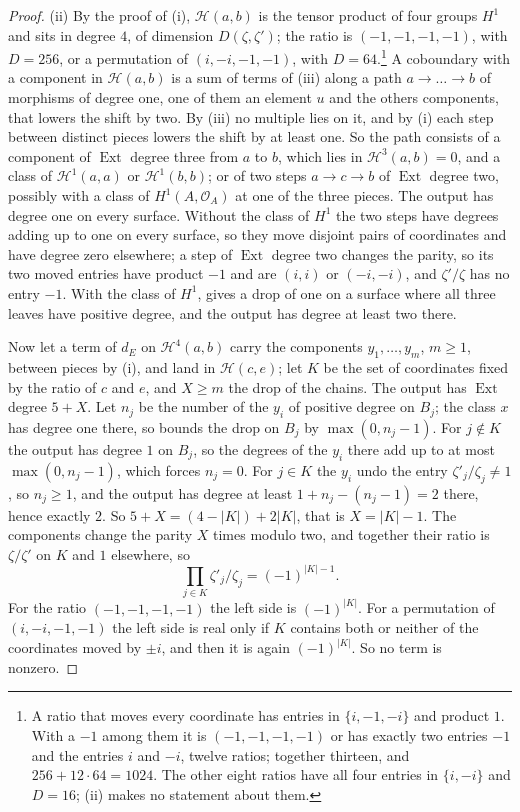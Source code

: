 \documentclass[11pt,reqno]{amsart}
\theoremstyle{plain}
\theoremstyle{definition}
\theoremstyle{remark}
\newcommand{\cO}{\mathcal{O}}
\newcommand{\cH}{\mathcal{H}}
\DeclareMathOperator{\Ext}{Ext}
\begin{document}
\begin{proof}
(ii) By the proof of (i), $\cH(a,b)$ is the tensor
product of four groups $H^{1}$ and sits in degree $4$, of dimension
$D(\zeta,\zeta')$; the ratio is $(-1,-1,-1,-1)$, with $D=256$, or a
permutation of $(i,-i,-1,-1)$, with $D=64$.\footnote{A ratio that moves
every coordinate has entries in $\{i,-1,-i\}$ and product $1$. With a $-1$
among them it is $(-1,-1,-1,-1)$ or has exactly two entries $-1$ and the
entries $i$ and $-i$, twelve ratios; together thirteen, and
$256+12\cdot64=1024$. The other eight ratios have all four entries in
$\{i,-i\}$ and $D=16$; (ii) makes no statement about them.}\enlargethispage{3pt} A coboundary with a component in $\cH(a,b)$ is
a sum of terms of (iii) along a path
$a\to\dots\to b$ of morphisms of degree one, one of them an element $u$ and
the others components, that lowers the shift by two. By
(iii) no multiple lies on it, and by
(i) each step between distinct pieces lowers the shift
by at least one. So the path consists of a component of $\Ext$ degree three
from $a$ to $b$, which lies in $\cH^{3}(a,b)=0$, and a class of
$\cH^{1}(a,a)$ or $\cH^{1}(b,b)$; or of two steps $a\to c\to b$ of $\Ext$
degree two, possibly with a class of $H^{1}(A,\cO_{A})$ at one of the three
pieces. The output has degree one on every surface. Without the class of
$H^{1}$ the two steps have degrees adding up to one on every surface, so they
move disjoint pairs of coordinates and have degree zero elsewhere; a step of
$\Ext$ degree two changes the parity, so its two moved entries have product
$-1$ and are $(i,i)$ or $(-i,-i)$, and $\zeta'/\zeta$ has no entry $-1$.
With the class of $H^{1}$,  gives a drop of one on a
surface where all three leaves have positive degree, and the output has
degree at least two there.

Now let a term of $d_{E}$ on $\cH^{4}(a,b)$ carry the components
$y_{1},\dots,y_{m}$, $m\ge1$, between pieces by (i), and land in
$\cH(c,e)$; let $K$ be the set of coordinates fixed by the ratio of $c$ and
$e$, and $X\ge m$ the drop of the chains. The output has $\Ext$ degree
$5+X$. Let $n_{j}$ be the number of the $y_{i}$ of positive degree on
$B_{j}$; the class $x$ has degree one there, so  bounds
the drop on $B_{j}$ by $\max(0,n_{j}-1)$. For $j\notin K$ the output has
degree $1$ on $B_{j}$, so the degrees of the $y_{i}$ there add up to at most
$\max(0,n_{j}-1)$, which forces $n_{j}=0$. For $j\in K$ the $y_{i}$ undo the
entry $\zeta'_{j}/\zeta_{j}\ne1$, so $n_{j}\ge1$, and the output has degree
at least $1+n_{j}-(n_{j}-1)=2$ there, hence exactly $2$. So
$5+X=(4-|K|)+2|K|$, that is $X=|K|-1$. The components change the parity
$X$ times modulo two, and together their ratio is $\zeta/\zeta'$ on $K$ and
$1$ elsewhere, so
\[
  \prod_{j\in K}\zeta'_{j}/\zeta_{j}=(-1)^{|K|-1}.
\]
For the ratio $(-1,-1,-1,-1)$ the left side is $(-1)^{|K|}$. For a
permutation of $(i,-i,-1,-1)$ the left side is real only if $K$ contains
both or neither of the coordinates moved by $\pm i$, and then it is again
$(-1)^{|K|}$. So no term is nonzero.


\end{proof}
\end{document}
